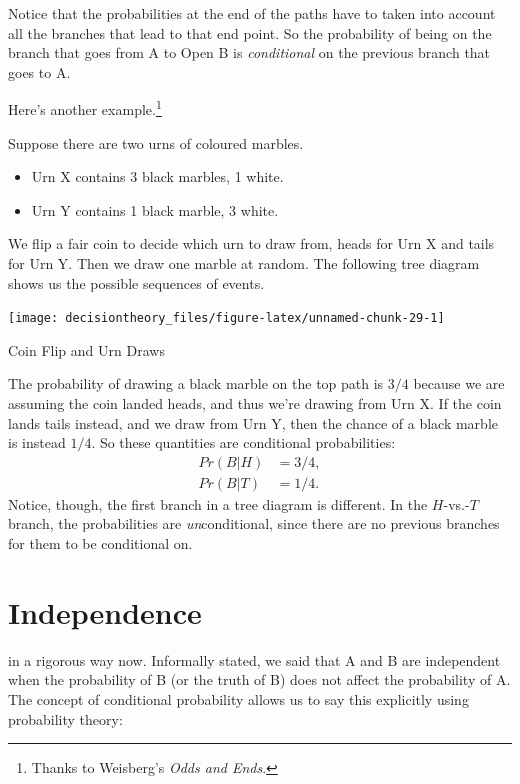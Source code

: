 \documentclass[]{tufte-book}
\providecommand{\tightlist}{%
  \setlength{\itemsep}{0pt}\setlength{\parskip}{0pt}}
\begin{document}
Notice that the probabilities at the end of the paths have to taken into account all the branches that lead to that end point. So the probability of being on the branch that goes from A to Open B is \emph{conditional} on the previous branch that goes to A.

Here's another example.\footnote{Thanks to Weisberg's \emph{Odds and Ends}.}

Suppose there are two urns of coloured marbles.

\begin{itemize}
\tightlist
\item
  Urn X contains 3 black marbles, 1 white.
\item
  Urn Y contains 1 black marble, 3 white.
\end{itemize}

We flip a fair coin to decide which urn to draw from, heads for Urn X and tails for Urn Y. Then we draw one marble at random. The following tree diagram shows us the possible sequences of events.

\begin{marginfigure}
\texttt{[image: decisiontheory\_files/figure-latex/unnamed-chunk-29-1]} \caption[Coin Flip and Urn Draws]{Coin Flip and Urn Draws}\label{fig:unnamed-chunk-29}
\end{marginfigure}

The probability of drawing a black marble on the top path is \(3/4\) because we are assuming the coin landed heads, and thus we're drawing from Urn X. If the coin lands tails instead, and we draw from Urn Y, then the chance of a black marble is instead \(1/4\). So these quantities are conditional probabilities:
\[
  \begin{aligned}
    Pr(B | H) &= 3/4,\\
    Pr(B | T) &= 1/4.
  \end{aligned}
\]
Notice, though, the first branch in a tree diagram is different. In the \(H\)-vs.-\(T\) branch, the probabilities are \emph{un}conditional, since there are no previous branches for them to be conditional on.

\hypertarget{independence-1}{%
\section{Independence}\label{independence-1}}

 in a rigorous way now. Informally stated, we said that A and B are independent when the probability of B (or the truth of B) does not affect the probability of A. The concept of conditional probability allows us to say this explicitly using probability theory:
\end{document}
